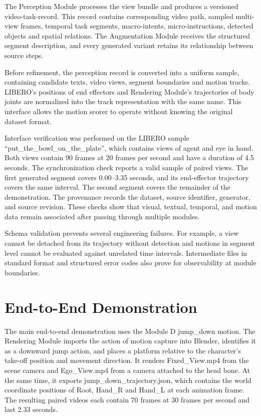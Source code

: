 \documentclass[11pt,oneside]{report}
\begin{document}
The Perception Module processes the view bundle and produces a versioned video-task-record. This record contains corresponding video path, sampled multi-view frames, temporal task segments, macro-intents, micro-instructions, detected objects and spatial relations. The Augmentation Module receives the structured segment description, and every generated variant retains its relationship between source steps.

Before refinement, the perception record is converted into a uniform sample, containing candidate texts, video views, segment boundaries and motion tracks. LIBERO’s positions of end effectors and Rendering Module’s trajectories of body joints are normalized into the track representation with the same name. This interface allows the motion scorer to operate without knowing the original dataset format.

Interface verification was performed on the LIBERO sample “put\_the\_bowl\_on\_the\_plate”, which contains views of agent and eye in hand. Both views contain 90 frames at 20 frames per second and have a duration of 4.5 seconds. The synchronization check reports a valid sample of paired views. The first generated segment covers 0.00–3.35 seconds, and its end-effector trajectory covers the same interval. The second segment covers the remainder of the demonstration. The provenance records the dataset, source identifier, generator, and source revision. These checks show that visual, textual, temporal, and motion data remain associated after passing through multiple modules.

Schema validation prevents several engineering failures. For example, a view cannot be detached from its trajectory without detection and motions in segment level cannot be evaluated against unrelated time intervals. Intermediate files in standard format and structured error codes also prove for observability at module boundaries.

\section{End-to-End Demonstration}

The main end-to-end demonstration uses the Module D jump\_down motion. The Rendering Module imports the action of motion capture into Blender, identifies it as a downward jump action, and places a platform relative to the character’s take-off position and movement direction. It renders Fixed\_View.mp4 from the scene camera and Ego\_View.mp4 from a camera attached to the head bone. At the same time, it exports jump\_down\_trajectory.json, which contains the world coordinate positions of Root, Hand\_R and Hand\_L at each animation frame. The resulting paired videos each contain 70 frames at 30 frames per second and last 2.33 seconds.
\end{document}
